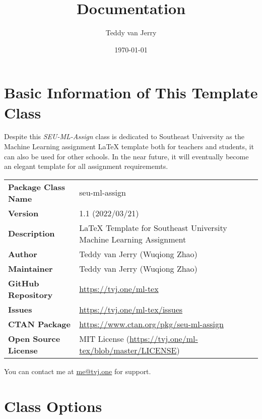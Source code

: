 \documentclass[twoside]{seu-ml-assign}
\title{Documentation}
\author{Teddy van Jerry}
\date{\today}
\newcommand{\grayrow}{\rowcolor[rgb]{ .906,  .902,  .902}}
\begin{document}
  \maketitle

  \section{Basic Information of This Template Class}

    Despite this \textit{SEU-ML-Assign} class is dedicated to Southeast University as the Machine Learning assignment \LaTeX{} template both for teachers and students, it can also be used for other schools.
    In the near future, it will eventually become an elegant template for all assignment requirememts.

    \begin{table}[htbp]
      \bgroup
        \def\arraystretch{1.2}
        \setlength{\tabcolsep}{1.5em}
        \begin{tabular}{ll}
        \toprule
          \grayrow \textbf{Package Class Name} & seu-ml-assign \\
          \textbf{Version} & 1.1 (2022/03/21) \\
          \grayrow \textbf{Description} & \LaTeX{} Template for Southeast University Machine Learning Assignment \\
          \textbf{Author} & Teddy van Jerry (Wuqiong Zhao) \\
          \grayrow \textbf{Maintainer} & Teddy van Jerry (Wuqiong Zhao) \\
          \textbf{GitHub Repository} & \url{https://tvj.one/ml-tex} \\
          \grayrow \textbf{Issues} & \url{https://tvj.one/ml-tex/issues} \\
          \textbf{CTAN Package} & \url{https://www.ctan.org/pkg/seu-ml-assign} \\
          \grayrow\textbf{Open Source License} & MIT License (\url{https://tvj.one/ml-tex/blob/master/LICENSE}) \\
        \bottomrule
        \end{tabular}%
      \egroup
    \end{table}

    You can contact me at \href{mailto:me@tvj.one}{me@tvj.one} for support.

  \section{Class Options}
\end{document}
